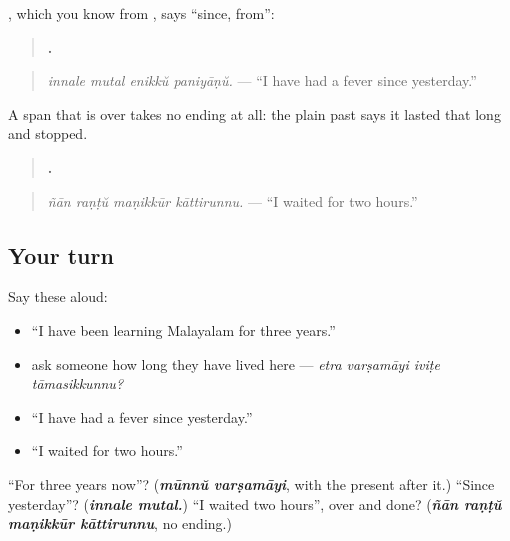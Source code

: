 \begin{grammarlens}[title={Grammar Lens: since, and a finished span}]
\textbf{}, which you know from \textbf{ }, says \textquotedblleft{}since, from\textquotedblright{}:

\begin{quote}
\textbf{   .}
\end{quote}

\begin{quote}
\emph{innale mutal enikkŭ paniyāṇŭ.} — \textquotedblleft{}I have had a fever since yesterday.\textquotedblright{}
\end{quote}

A span that is over takes no ending at all: the plain past says it lasted that long and stopped.

\begin{quote}
\textbf{   .}
\end{quote}

\begin{quote}
\emph{ñān raṇṭŭ maṇikkūr kāttirunnu.} — \textquotedblleft{}I waited for two hours.\textquotedblright{}
\end{quote}
\end{grammarlens}

\subsection*{Your turn}
Say these aloud:

\begin{itemize}
\raggedright
  \item \textquotedblleft{}I have been learning Malayalam for three years.\textquotedblright{}
  \item ask someone how long they have lived here — \emph{etra varṣamāyi iviṭe tāmasikkunnu?}
  \item \textquotedblleft{}I have had a fever since yesterday.\textquotedblright{}
  \item \textquotedblleft{}I waited for two hours.\textquotedblright{}
\end{itemize}

\begin{tcolorbox}[breakable,colback=teal!4,colframe=teal!35!black,title={Before you move on}]
\textquotedblleft{}For three years now\textquotedblright{}? (\emph{\textbf{mūnnŭ varṣamāyi}}, with the present after it.) \textquotedblleft{}Since yesterday\textquotedblright{}? (\emph{\textbf{innale mutal.}}) \textquotedblleft{}I waited two hours\textquotedblright{}, over and done? (\emph{\textbf{ñān raṇṭŭ maṇikkūr kāttirunnu}}, no ending.)
\end{tcolorbox}
